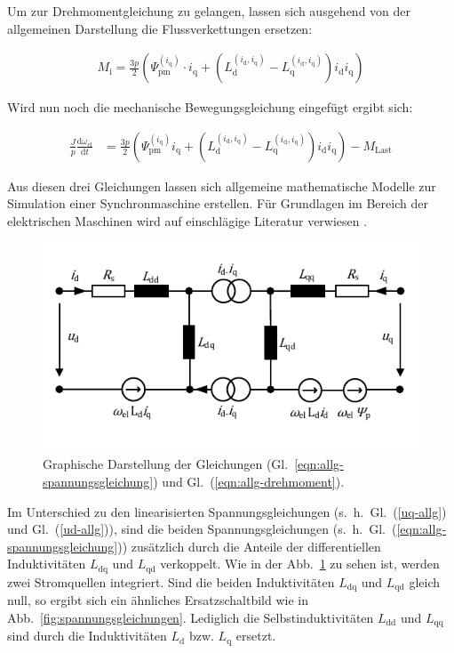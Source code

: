 \documentclass[conference,twocolumn]{IEEEtran}
\newcommand{\x}[1]{\mathrm{#1}}
\begin{document}
Um zur Drehmomentgleichung zu gelangen, lassen sich ausgehend von der allgemeinen Darstellung die Flussverkettungen ersetzen:

\begin{align}
M_\x{i} = \frac{3p}{2}\left( \Psi_\x{pm}^{(i_\x{q})}\cdot i_\x{q} + (L_\x{d}^{(i_\x{d},i_\x{q})}-L_\x{q}^{(i_\x{d},i_\x{q})})i_\x{d} i_\x{q}\right)
\end{align}

Wird nun noch die mechanische Bewegungsgleichung eingefügt ergibt sich:

\begin{small}
\begin{align}
\frac{J}{p}\frac{\x{d}\omega_\x{el}}{\x{d}t} &= \frac{3p}{2}(\Psi^{(i_\x{q})}_\x{pm}i_\x{q} + (L^{(i_\x{d},i_\x{q})}_\x{d}-L^{(i_\x{d},i_\x{q})}_\x{q})i_\x{d} i_\x{q}) - M_\x{Last} \label{eqn:allg-drehmoment}
\end{align}
\end{small}

Aus diesen drei Gleichungen lassen sich allgemeine mathematische Modelle zur Simulation einer Synchronmaschine erstellen. 
Für Grundlagen im Bereich der elektrischen Maschinen wird auf einschlägige Literatur verwiesen \autocites{mullerII2008}{mullerI2005}{fischer2009}{schroder2001}.

\begin{figure}[!h]
\centering
\includegraphics[width=\columnwidth]{img/allg-spannungsgleichung}
\caption{Graphische Darstellung der Gleichungen (Gl.~\ref{eqn:allg-spannungsgleichung}) und Gl.~(\ref{eqn:allg-drehmoment}).}
\label{fig:allg-spannungsgleichung}
\end{figure}

Im Unterschied zu den linearisierten Spannungsgleichungen (s.~h.~Gl.~(\ref{uq-allg}) und Gl.~(\ref{ud-allg})), sind die beiden Spannungsgleichungen (s.~h.~Gl.~(\ref{eqn:allg-spannungsgleichung})) zusätzlich durch die Anteile der differentiellen Induktivitäten $L_\x{dq}$ und $L_\x{qd}$ verkoppelt.
Wie in der Abb.~\ref{fig:allg-spannungsgleichung} zu sehen ist, werden zwei Stromquellen integriert.
Sind die beiden Induktivitäten $L_\x{dq}$ und $L_\x{qd}$ gleich null, so ergibt sich ein ähnliches Ersatzschaltbild wie in Abb.~\ref{fig:spannungsgleichungen}.
Lediglich die Selbstinduktivitäten $L_\x{dd}$ und $L_\x{qq}$ sind durch die Induktivitäten $L_\x{d}$ bzw. $L_\x{q}$ ersetzt.
\end{document}
